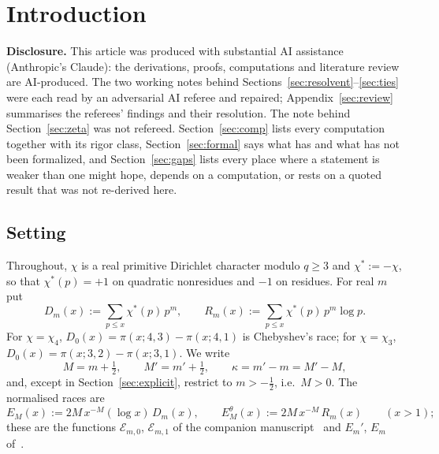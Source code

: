 \documentclass[11pt]{amsart}
\theoremstyle{definition}
\numberwithin{equation}{section}
\newcommand{\cE}{\mathcal E}
\newcommand{\Ein}{E^{\theta}}
\begin{document}
\maketitle

\section{Introduction}\label{sec:intro}

\noindent\textbf{Disclosure.} This article was produced with
substantial AI assistance (Anthropic's Claude): the derivations,
proofs, computations and literature review are AI-produced. The two
working notes behind Sections~\ref{sec:resolvent}--\ref{sec:ties}
were each read by an adversarial AI referee and repaired;
Appendix~\ref{sec:review} summarises the referees' findings and their
resolution. The note behind Section~\ref{sec:zeta} was not refereed.
Section~\ref{sec:comp} lists every computation together with its
rigor class, Section~\ref{sec:formal} says what has and what has not
been formalized, and Section~\ref{sec:gaps} lists every place where a
statement is weaker than one might hope, depends on a computation, or
rests on a quoted result that was not re-derived here.

\subsection{Setting}\label{subsec:setting}

Throughout, $\chi$ is a real primitive Dirichlet character modulo
$q\ge3$ and $\chi^*:=-\chi$, so that $\chi^*(p)=+1$ on quadratic
nonresidues and $-1$ on residues. For real $m$ put
\[
D_m(x):=\sum_{p\le x}\chi^*(p)\,p^m,\qquad
R_m(x):=\sum_{p\le x}\chi^*(p)\,p^m\log p .
\]
For $\chi=\chi_4$, $D_0(x)=\pi(x;4,3)-\pi(x;4,1)$ is Chebyshev's race;
for $\chi=\chi_3$, $D_0(x)=\pi(x;3,2)-\pi(x;3,1)$. We write
\[
M=m+\tfrac12,\qquad M'=m'+\tfrac12,\qquad\kappa=m'-m=M'-M,
\]
and, except in Section~\ref{sec:explicit}, restrict to $m>-\tfrac12$,
i.e.\ $M>0$. The normalised races are
\begin{equation}\label{eq:normalised}
E_M(x):=2M\,x^{-M}(\log x)\,D_m(x),\qquad
\Ein_M(x):=2M\,x^{-M}\,R_m(x)\qquad(x>1);
\end{equation}
these are the functions $\cE_{m,0}$, $\cE_{m,1}$ of the companion
manuscript~\cite{MC} and $E_m'$, $E_m$ of~\cite{WR}.
\end{document}
